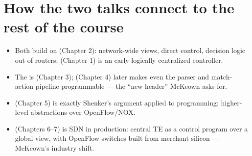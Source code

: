 \section{How the two talks connect to the rest of the course}
\begin{itemize}
\item Both build on  (Chapter 2): network-wide views, direct control, decision logic out of routers;  (Chapter 1) is an early logically centralized controller.
\item The  is  (Chapter 3);  (Chapter 4) later makes even the parser and match-action pipeline programmable --- the ``new header'' McKeown asks for.
\item {} (Chapter 5) is exactly Shenker's argument applied to programming: higher-level abstractions over OpenFlow/NOX.
\item {} (Chapters 6--7) is SDN in production: central TE as a control program over a global view, with OpenFlow switches built from merchant silicon --- McKeown's industry shift.
\end{itemize}


